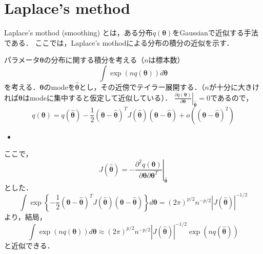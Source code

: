 %
%
\section{Laplace's method}
\label{sec:laplace}
Laplace's mothod (smoothing) とは，ある分布$q(\bm{\theta})$をGaussianで近似する手法である．
ここでは，Laplace's mothodによる分布の積分の近似を示す．\cite{konishi_kitagawa200409}

パラメータ$\bm{\theta}$の分布に関する積分を考える（$n$は標本数）
\begin{equation}
  \label{eq:1}
  \int \exp(n q(\bm{\theta}))d \bm{\theta}
\end{equation}
を考える．$\bm{\theta}$のmodeを$\bm{\hat{\theta}}$とし，その近傍でテイラー展開する．（$n$が十分に大きければ$\bm{\theta}$はmodeに集中すると仮定して近似している）．
$\left.\frac{\partial q(\bm{\theta})}{\partial \bm{\theta}}\right|_{\bm{\hat{\theta}}}=0$であるので，
\begin{equation}
  \label{eq:2}
  q(\bm{\theta}) =   q(\bm{\hat{\theta}}) -
  \frac{1}{2}(\bm{\theta} - \bm{\hat{\theta}})^T J(\bm{\hat{\theta}}) (\bm{\theta} - \bm{\hat{\theta}}) + o((\bm{\theta} - \bm{\hat{\theta}})^2)
\end{equation}
\begin{itemize}
\item 
\end{itemize}
ここで，
\begin{equation}
  \label{eq:3}
  J(\bm{\hat{\theta}}) = - \left.\frac{\partial^2 q(\bm{\theta})}{\partial \bm{\theta} \partial \bm{\theta}^T}\right|_{\bm{\hat{\theta}}}
\end{equation}
とした．
\begin{equation}
  \label{eq:5}
  \int \exp\left\{-\frac{1}{2}(\bm{\theta} - \bm{\hat{\theta}})^T J(\bm{\hat{\theta}}) (\bm{\theta} - \bm{\hat{\theta}}) \right\}d\bm{\theta} = (2\pi)^{p/2} n^{-p/2} |J(\bm{\hat{\theta}})|^{-1/2}
\end{equation}
より，結局，
\begin{equation}
  \label{eq:6}
    \int \exp(n q(\bm{\theta}))d \bm{\theta} \approx
    (2\pi)^{p/2} n^{-p/2} |J(\bm{\hat{\theta}})|^{-1/2} \exp(nq(\bm{\hat{\theta}}))
\end{equation}
と近似できる．

